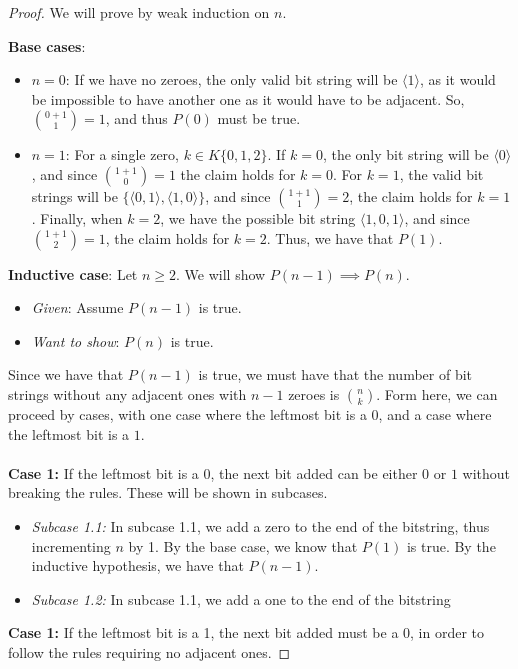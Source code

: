 \documentclass[titlepage]{article}
\begin{document}
\begin{proof}
We will prove by weak induction on $n$.

\textbf{Base cases}: 
\begin{itemize}
\item \emph{$n = 0$}: If we have no zeroes, the only valid bit string will be $\langle 1 \rangle$, as it would be impossible to have another one as it would have to be adjacent. So, ${{0+1}\choose{1}}=1$, and thus $P(0)$ must be true.
\item \emph{$n = 1$}: For a single zero, $k \in K\{0,1,2\}$. If $k=0$, the only bit string will be $\langle 0 \rangle$, and since ${{1+1}\choose{0}}=1$ the claim holds for $k=0$. For $k=1$, the valid bit strings will be $\{\langle 0,1 \rangle , \langle 1,0 \rangle\}$, and since ${{1+1}\choose{1}}=2$, the claim holds for $k=1$. Finally, when $k=2$, we have the possible bit string $\langle 1,0,1 \rangle$, and since ${{1+1}\choose{2}}=1$, the claim holds for $k=2$. Thus, we have that $P(1)$.
\end{itemize}


\textbf{Inductive case}: Let $n \geq 2$.  We will show $ P(n-1) \implies P(n)$.
\begin{itemize}
\item \emph{Given}: Assume $P(n-1)$ is true.
\item \emph{Want to show}: $P(n)$ is true.
\end{itemize}
Since we have that $P(n-1)$ is true, we must have that the number of bit strings without any adjacent ones with $n-1$ zeroes is ${n}\choose{k}$. Form here, we can proceed by cases, with one case where the leftmost bit is a $0$, and a case where the leftmost bit is a $1$.\\
\\
\textbf{Case 1:} If the leftmost bit is a 0, the next bit added can be either $0$ or $1$ without breaking the rules. These will be shown in subcases.
\begin{itemize}
\item \emph{Subcase 1.1:} In subcase 1.1, we add a zero to the end of the bitstring, thus incrementing $n$ by 1. By the base case, we know that $P(1)$ is true. By the inductive hypothesis, we have that $P(n-1)$.
\item \emph{Subcase 1.2:} In subcase 1.1, we add a one to the end of the bitstring
\end{itemize}
\textbf{Case 1:} If the leftmost bit is a 1, the next bit added must be a 0, in order to follow the rules requiring no adjacent ones.
\end{proof}
\end{document}
